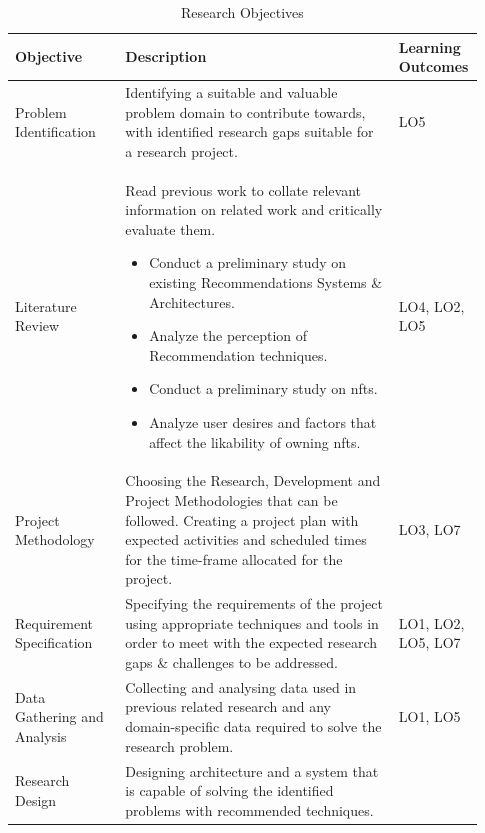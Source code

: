 \documentclass[a4paper, 12pt, oneside]{report}
\begin{document}
\begin{longtable}{| p{0.23\linewidth} | p{0.58\linewidth}| p{0.12\linewidth}|}
\caption{Research Objectives}
\label{tab:research-objectives-table}\\
\hline
Objective &   Description & Learning Outcomes  \\ 
\hline
Problem Identification & Identifying a suitable and valuable problem domain to contribute towards, with identified research gaps suitable for a research project.
& LO5 \\
\hline
Literature Review & Read previous work to collate relevant information on related work and critically evaluate them.
\begin{itemize}
\item Conduct a preliminary study on existing Recommendations Systems \& Architectures.
\item Analyze the perception of Recommendation techniques.
\item Conduct a preliminary study on \Gls{nft}s.
\item Analyze user desires and factors that affect the likability of owning \Gls{nft}s.
\end{itemize}
& LO4, LO2, LO5 \\
\hline
Project Methodology & Choosing the Research, Development and Project Methodologies that can be followed. Creating a project plan with expected activities and scheduled times for the time-frame allocated for the project.
& LO3, LO7 \\
\hline
Requirement Specification & Specifying the requirements of the project using appropriate techniques and tools in order to meet with the expected research gaps \& challenges to be addressed.
& LO1, LO2, LO5, LO7\\
\hline
Data Gathering and Analysis & Collecting and analysing data used in previous related research and any domain-specific data required to solve the research problem.  
& LO1, LO5 \\
\hline
Research Design & Designing architecture and a system that is capable of solving the identified problems with recommended techniques.

\end{longtable}
\end{document}
